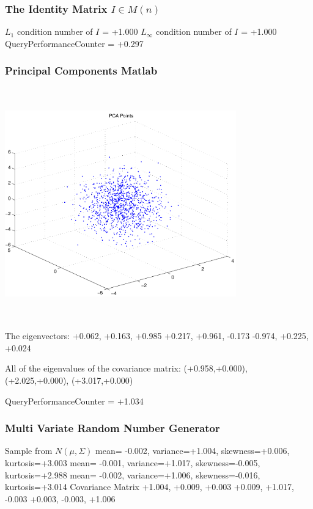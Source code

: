 \documentclass[9pt]{article}
\theoremstyle{plain}
\theoremstyle{definition}
\theoremstyle{remark}
\numberwithin{equation}{section}
\begin{document}
\subsubsection{The Identity Matrix $I \in M(n)$}
$L_1$ condition number of $I$ = +1.000
$L_\infty$ condition number of $I$ = +1.000
QueryPerformanceCounter  =  +0.297
\subsubsection{Principal Components Matlab }
\includegraphics[width=10.0cm,height=10.0cm]{PCAPoints.pdf}

The eigenvectors:
+0.062, +0.163, +0.985
+0.217, +0.961, -0.173
-0.974, +0.225, +0.024

All of the eigenvalues of the covariance matrix:
(+0.958,+0.000), (+2.025,+0.000), (+3.017,+0.000)

QueryPerformanceCounter  =  +1.034
\subsubsection{Multi Variate Random Number Generator }
Sample from $N(\mu,\Sigma)$
mean= -0.002, variance=+1.004, skewness=+0.006, kurtosis=+3.003
mean= -0.001, variance=+1.017, skewness=-0.005, kurtosis=+2.988
mean= -0.002, variance=+1.006, skewness=-0.016, kurtosis=+3.014
Covariance Matrix 
+1.004, +0.009, +0.003
+0.009, +1.017, -0.003
+0.003, -0.003, +1.006
\end{document}
